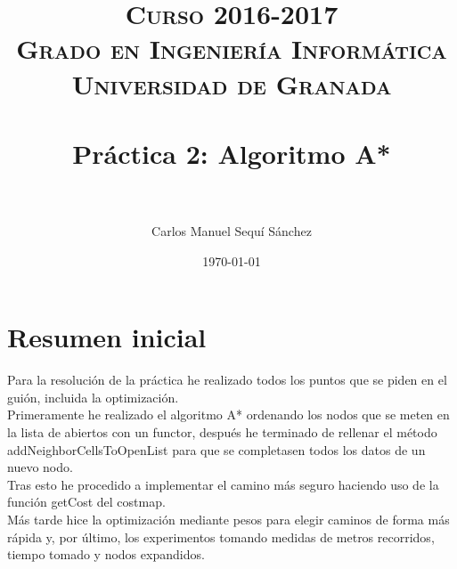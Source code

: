 



\title{	
\normalfont \normalsize 
\textsc{\textbf{Curso 2016-2017} \\ Grado en Ingeniería Informática \\ Universidad de Granada} \\ [25pt] %
\horrule{0.5pt} \\[0.4cm] %
\huge Práctica 2: Algoritmo A* \\ %
\horrule{2pt} \\[0.5cm] %
}

\author{Carlos Manuel Sequí Sánchez} %

\date{\normalsize\today} %







\maketitle %

\newpage %

\tableofcontents %

\listoffigures

\newpage

\section{Resumen inicial}

Para la resolución de la práctica he realizado todos los puntos que se piden en el guión, incluida la optimización. \\
Primeramente he realizado el algoritmo A* ordenando los nodos que se meten en la lista de abiertos con un functor, después he terminado de rellenar el método addNeighborCellsToOpenList para que se completasen todos los datos de un nuevo nodo.\\ Tras esto he procedido a implementar el camino más seguro haciendo uso de la función getCost del costmap. \\ Más tarde hice la optimización mediante pesos para elegir caminos de forma más rápida y, por último, los experimentos tomando medidas de metros recorridos, tiempo tomado y nodos expandidos. \\

